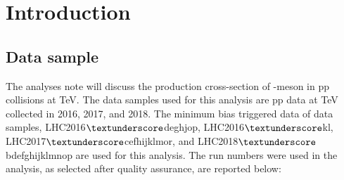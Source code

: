 \linenumbers


\section{Introduction}


 
 
\subsection{Data sample}
\label{sec:data_sample}
The analyses note will discuss the production cross-section of \Dstar -meson in pp collisions at  TeV. The data samples used for this analysis are pp data at  TeV collected in 2016, 2017, and 2018. The minimum bias triggered data of data samples, LHC2016$\textunderscore$deghjop, LHC2016$\textunderscore$kl, LHC2017$\textunderscore$cefhijklmor, and LHC2018$\textunderscore$bdefghijklmnop are used for this analysis. The run numbers were used in the analysis, as selected after quality assurance, are reported below:
 




